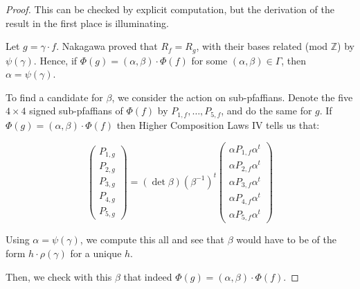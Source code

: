 \documentclass{article}
\begin{document}
\begin{proof}
This can be checked by explicit computation, but the derivation of the result in the first place is illuminating.

Let $g = \gamma \cdot f$.  Nakagawa proved that $R_f = R_g$, with their bases related (mod $\mathbb{Z}$) by $\psi(\gamma)$.  Hence, if $\Phi(g) = ( \alpha , \beta ) \cdot \Phi(f)$ for some $( \alpha , \beta ) \in \Gamma$, then $\alpha = \psi ( \gamma )$.

To find a candidate for $\beta$, we consider the action on sub-pfaffians.  Denote the five $4 \times 4$ signed sub-pfaffians of $\Phi(f)$ by $P_{1,f}, \ldots, P_{5,f}$, and do the same for $g$.  If $\Phi(g) = ( \alpha, \beta ) \cdot \Phi(f)$ then Higher Composition Laws IV tells us that:

\begin{equation}
\begin{pmatrix}
P_{1,g} \\ P_{2,g} \\ P_{3,g} \\ P_{4,g} \\ P_{5,g}
\end{pmatrix}
=
(\det \beta ) (\beta^{-1})^t
\begin{pmatrix}
\alpha P_{1,f} \alpha^t \\\alpha  P_{2,f} \alpha^t \\ \alpha P_{3,f} \alpha^t \\ \alpha P_{4,f} \alpha^t \\ \alpha P_{5,f} \alpha^t
\end{pmatrix}
\end{equation}

Using $\alpha = \psi ( \gamma )$, we compute this all and see that $\beta$ would have to be of the form $h \cdot \rho( \gamma )$ for a unique $h$.

Then, we check with this $\beta$ that indeed $\Phi(g) = (\alpha,\beta) \cdot \Phi(f)$.
\end{proof}
\end{document}
